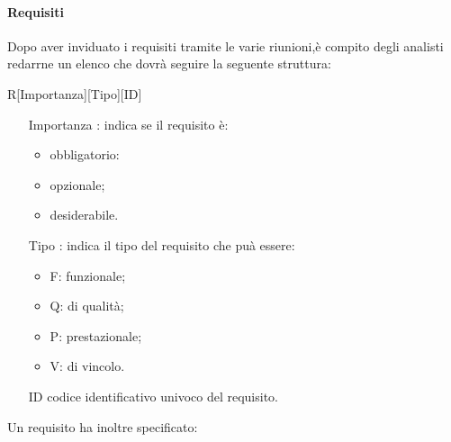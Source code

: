 		\paragraph{Requisiti}%
		Dopo aver inviduato i requisiti tramite le varie riunioni,è compito degli analisti redarrne un elenco che dovrà seguire la seguente struttura:
		\centerline{R[Importanza][Tipo][ID]}
		\begin{itemize}
			\item[Importanza]: indica se il requisito è:
			\begin{itemize}
				\item obbligatorio:
				\item opzionale;
				\item desiderabile.
			\end{itemize}
			\item[Tipo]: indica il tipo del requisito che puà essere:
			\begin{itemize}
				\item F: funzionale;
				\item Q: di qualità;
				\item P: prestazionale;
				\item V: di vincolo.
			\end{itemize}
			\item [ID] codice identificativo univoco del requisito.
		\end{itemize}
	    Un requisito ha inoltre specificato:
